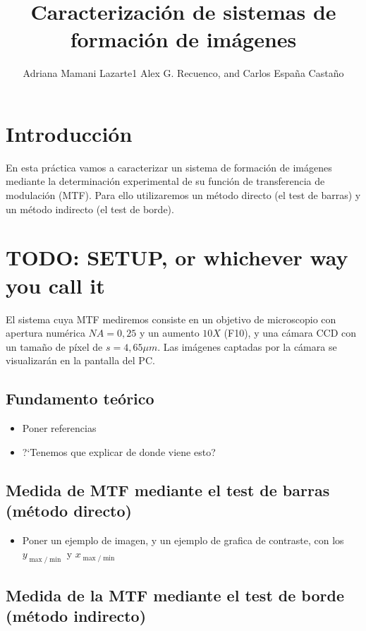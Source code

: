 \documentclass{./packages/optica-article}
\begin{document}
\title{Caracterización de sistemas de formación de imágenes}

\author{Adriana Mamani Lazarte{1} Alex G. Recuenco, and Carlos España Castaño}

\address{Universidad Complutense de Madrid, Madrid, PC 28040, España}

\section{Introducción}
En esta práctica vamos a caracterizar un sistema de formación de imágenes mediante la determinación experimental de su función de transferencia de modulación (MTF). Para ello utilizaremos un método directo (el test de barras) y un método indirecto (el test de borde).


\section{TODO: SETUP, or whichever way you call it}

El sistema cuya MTF mediremos consiste en un objetivo de microscopio con apertura numérica $NA = 0,25$ y un aumento $10X$ (F10), y una cámara CCD con un tamaño de píxel de $s=4,65 \mu m$. Las imágenes captadas por la cámara se visualizarán en la pantalla del PC.

\subsection{Fundamento teórico}

\begin{itemize}
	\item Poner referencias
	\item ?`Tenemos que explicar de donde viene esto?
\end{itemize}


\subsection{Medida de MTF mediante el test de barras (método directo)}

\begin{itemize}
	\item Poner un ejemplo de imagen, y un ejemplo de grafica de contraste, con los $y_{\max/\min}$ y $x_{\max/\min}$

\end{itemize}

\subsection{Medida de la MTF mediante el test de borde (método indirecto)}
\end{document}
